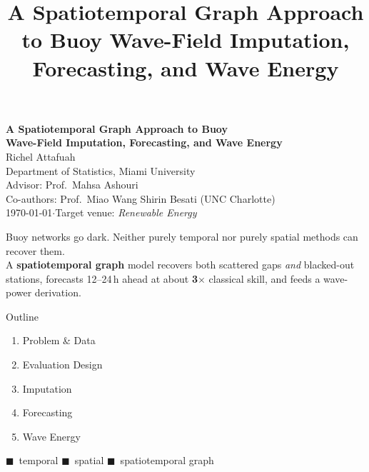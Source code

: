 \documentclass[aspectratio=169]{beamer}
\title[Spatiotemporal Graph Wave Modelling]{A Spatiotemporal Graph Approach to Buoy Wave-Field Imputation, Forecasting, and Wave Energy}
\newcommand{\plegend}{{\footnotesize%
  \textcolor{coltemporal}{$\blacksquare$}~temporal\quad
  \textcolor{colspatial}{$\blacksquare$}~spatial\quad
  \textcolor{colgraph}{$\blacksquare$}~spatiotemporal graph}}
\begin{document}
\begin{frame}[plain]
  \vfill
  \begin{center}
    {\color{colgraph}\Large\bfseries A Spatiotemporal Graph Approach to Buoy\\[0.3ex]
     Wave-Field Imputation, Forecasting, and Wave Energy}\\[2.0ex]
    {\large Richel Attafuah}\\[0.4ex]
    {\small Department of Statistics, Miami University}\\[1.6ex]
    {\footnotesize Advisor: Prof.\ Mahsa Ashouri}\\[0.3ex]
    {\footnotesize Co-authors: Prof.\ Miao Wang \quad Shirin Besati (UNC Charlotte)}\\[1.6ex]
    {\footnotesize \today \quad$\cdot$\quad Target venue: \emph{Renewable Energy}}
  \end{center}
  \vfill
\end{frame}

\begin{frame}
  \vfill
  \begin{center}\large
  Buoy networks go dark. Neither purely \textcolor{coltemporal}{temporal} nor purely
  \textcolor{colspatial}{spatial} methods can recover them.\\[1.5ex]
  A \textcolor{colgraph}{\bfseries spatiotemporal graph} model recovers both scattered gaps
  \emph{and} blacked-out stations, forecasts 12--24\,h ahead at about
  \textcolor{colgraph}{\bfseries 3$\times$} classical skill, and feeds a wave-power derivation.
  \end{center}
  \vfill
\end{frame}

\begin{frame}{Outline}
  \begin{enumerate}
    \item[\textbf{I}] Problem \& Data
    \item[\textbf{II}] Evaluation Design
    \item[\textbf{III}] Imputation
    \item[\textbf{IV}] Forecasting
    \item[\textbf{V}] Wave Energy
  \end{enumerate}
  \vfill\plegend
\end{frame}
\end{document}
